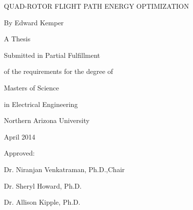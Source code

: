 \documentclass[12pt, letterpaper, oneside]{Thesis} %
\title{\ttitle} %
\begin{document}
\frontmatter %


\pagestyle{plain} %

\newcommand{\HRule}{\rule{\linewidth}{0.5mm}} %
\newcommand{\p}{\partial}
\newcommand{\spa}{\text{ }}
\newcommand{\cc}{\mathfrak{C}} %
\hypersetup{pdfsubject=\subjectname}
\hypersetup{pdfauthor=\authornames}
\hypersetup{pdfkeywords=\keywordnames}


\begin{titlepage}
\begin{center}

QUAD-ROTOR FLIGHT PATH ENERGY OPTIMIZATION
\vspace{15 mm}

By Edward Kemper

A Thesis

Submitted in Partial Fulfillment

of the requirements for the degree of

Masters of Science

in Electrical Engineering
\vspace{15 mm}

Northern Arizona University

April 2014
\vspace{20 mm}

Approved:

Dr. Niranjan Venkatraman, Ph.D.,Chair

Dr. Sheryl Howard, Ph.D.

Dr. Allison Kipple, Ph.D.



\clearpage
\maketitle
\thispagestyle{empty}

\end{center}
\clearpage
\maketitle
\thispagestyle{empty}
\end{titlepage}
\end{document}
